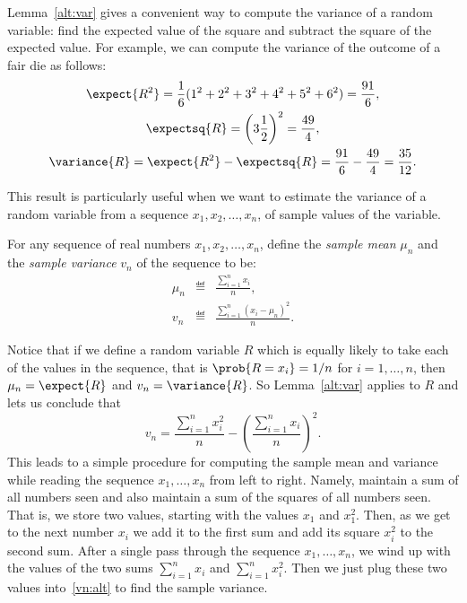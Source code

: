 \begin{editingnotes}

Lemma~\ref{alt:var} gives a convenient way to compute the variance of a
random variable: find the expected value of the square and subtract the
square of the expected value.  For example, we can compute the variance of
the outcome of a fair die as follows:
\begin{gather*}
  \expect{R^2} = \frac{1}{6} (1^2 + 2^2 + 3^2 + 4^2 + 5^2 + 6^2) = \frac{91}{6}, \\
  \expectsq{R} = \left(3 \frac{1}{2}\right)^2 = \frac{49}{4}, \\
  \variance{R}  = \expect{R^2} - \expectsq{R}
  = \frac{91}{6} - \frac{49}{4} = \frac{35}{12}.
\end{gather*}

This result is particularly useful when we want to estimate the variance
of a random variable from a sequence $x_1,x_2,\dots,x_n$, of sample values
of the variable.

\begin{definition*}
For any sequence of real numbers $x_1,x_2,\dots,x_n$, define the
\emph{sample mean} $\mu_n$ and the \emph{sample variance} $v_n$ of the
sequence to be:
\begin{eqnarray*}
\mu_n  & \eqdef & \frac{\sum_{i=1}^n x_i}{n},\\
v_n  & \eqdef & \frac{\sum_{i=1}^n (x_i - \mu_n)^2}{n}.
\end{eqnarray*}
\end{definition*}
Notice that if we define a random variable $R$ which is equally likely
to take each of the values in the sequence, that is $\prob{R = x_i} = 1/n$
for $i = 1,\dots,n$, then $\mu_n = \expect{R}$ and $v_n = \variance{R}$.
So Lemma~\ref{alt:var} applies to $R$ and lets us conclude that
\begin{equation}\label{vn:alt}
v_n = \frac{\sum_{i=1}^n x_i^2}{n} - \left(\frac{\sum_{i=1}^n x_i}{n}\right)^2.
\end{equation}
This leads to a simple procedure for computing the sample mean and
variance while reading the sequence $x_1,\dots,x_n$ from left to right.
Namely, maintain a sum of all numbers seen and also maintain a sum of the
squares of all numbers seen.  That is, we store two values, starting with
the values $x_1$ and $x_1^2$.  Then, as we get to the next number $x_i$
we add it to the first sum and add its square $x_{i}^2$ to the second
sum.  After a single pass through the sequence $x_1,\dots,x_n$, we wind up
with the values of the two sums $\sum_{i=1}^n x_i$ and $\sum_{i=1}^n
x_i^2$.  Then we just plug these two values into~\eqref{vn:alt} to find
the sample variance.


\end{editingnotes}
